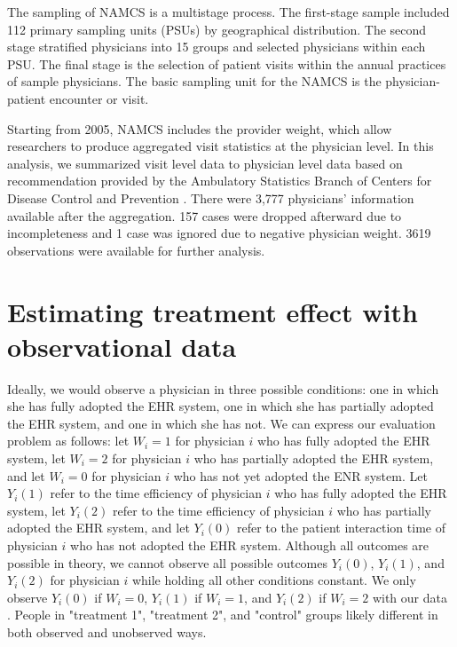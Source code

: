 \documentclass[12pt]{report}
\begin{document}
The sampling of NAMCS is a multistage process. The first-stage sample included 112 primary sampling units (PSUs) by geographical distribution. The second stage stratified physicians into 15 groups and selected physicians within each PSU. The final stage is the selection of patient visits within the annual practices of sample physicians. The basic sampling unit for the NAMCS is the physician-patient encounter or visit. 

Starting from 2005, NAMCS includes the provider weight, which allow researchers to produce aggregated visit statistics at the physician level. In this analysis, we summarized visit level data to physician level data based on recommendation provided by the Ambulatory Statistics Branch of Centers for Disease Control and Prevention \citep{SasProcedure}. There were 3,777 physicians' information available after the aggregation. 157 cases were dropped afterward due to incompleteness and 1 case was ignored due to negative physician weight. 3619 observations were available for further analysis. 

\section{Estimating treatment effect with observational data}
Ideally, we would observe a physician in three possible conditions: one in which she has fully adopted the EHR system, one in which she has partially adopted the EHR system, and one in which she has not. We can express our evaluation problem as follows: let $W_i = 1$ for physician $i$ who has fully adopted the EHR system, let $W_i = 2$ for physician $i$ who has partially adopted the EHR system, and let $W_i = 0$ for physician $i$ who has not yet adopted the ENR system. Let $Y_i(1)$ refer to the time efficiency of physician $i$ who has fully adopted the EHR system, let $Y_i(2)$ refer to the time efficiency of physician $i$ who has partially adopted the EHR system, and let $Y_i(0)$ refer to the patient interaction time of physician $i$ who has not adopted the EHR system. Although all outcomes are possible in theory, we cannot observe all possible outcomes $Y_i(0)$, $Y_i(1)$, and $Y_i(2)$ for physician $i$ while holding all other conditions constant. We only observe $Y_i(0)$ if $W_i = 0$, $Y_i(1)$ if $W_i = 1$, and $Y_i(2)$ if $W_i = 2$ with our data \citep{imbens2008recent}. People in "treatment 1", "treatment 2", and "control" groups likely different in both observed and unobserved ways.
\end{document}
